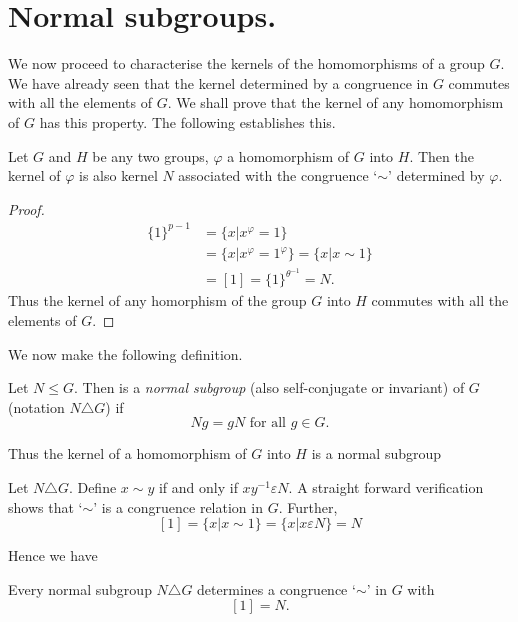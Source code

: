 \section{Normal subgroups.}%

We now proceed to characterise the kernels of the homomorphisms of a
group $G$. We have already seen that the kernel determined by a
congruence in $G$ commutes with all the elements of $G$. We shall
prove that the kernel of any homomorphism of $G$ has this
property. The following establishes this.    

\begin{Theorem} %
  Let $G$ and $H$ be any two groups, $\varphi$ a homomorphism of $G$
  into $H$. Then the kernel of $\varphi$ is also kernel $N$ associated
  with the congruence `$\sim$' determined by $\varphi$. 
\end{Theorem}

\begin{proof}
  \begin{align*}
    \{ 1 \}^{p-1} & = \bigg\{ x \big| x^\varphi = 1\bigg\}\\
    & = \bigg\{ x \big| x^\varphi = 1^\varphi \bigg\} = \bigg\{ x
    \big| x \sim 1\bigg\}\\ 
    & = [1] = \bigg\{ 1\bigg\}^{\theta {^{-1}}} = N.
  \end{align*}
  Thus the kernel of any homorphism of the group $G$ into $H$ commutes
  with all the elements of $G$. 
\end{proof}

We now make the following definition.

\begin{definition}
  Let $N \le G$. Then is a {\em normal subgroup} (also self-conjugate
  or invariant) of $G$ (notation $N \triangle G$) if 
  $$
  Ng = gN \text { for all } g \in G.
  $$

  Thus the kernel of a homomorphism of $G$ into $H$ is a normal subgroup 
\end{definition}

Let $N \triangle G$. Define $x \sim y$ if and only if $xy^{-1}
\varepsilon N$. A straight forward verification shows that `$\sim$' is
a congruence relation in $G$. Further, 
$$
[1] = \bigg\{ x \big| x \sim 1\bigg\} =\bigg\{ x \big| x \varepsilon N
\bigg\} = N 
$$

Hence we have
\begin{Theorem} %
  Every normal subgroup $N \triangle G$ determines a congruence `$\sim$'
  in $G$ with 
  $$
  [1] = N.
  $$
\end{Theorem}

